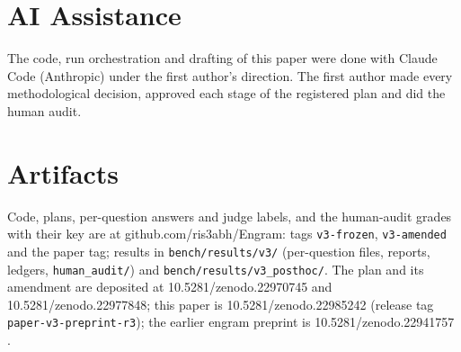 \documentclass[11pt]{article}
\begin{document}
\section*{AI Assistance}
The code, run orchestration and drafting of this paper were done with Claude Code (Anthropic) under the first author's direction. The first author made every methodological decision, approved each stage of the registered plan and did the human audit.

\section*{Artifacts}
Code, plans, per-question answers and judge labels, and the human-audit grades with their key are at github.com/ris3abh/Engram: tags \texttt{v3-frozen}, \texttt{v3-amended} and the paper tag; results in \texttt{bench/\allowbreak{}results/\allowbreak{}v3/\allowbreak{}} (per-question files, reports, ledgers, \texttt{human\_\allowbreak{}audit/\allowbreak{}}) and \texttt{bench/\allowbreak{}results/\allowbreak{}v3\_\allowbreak{}posthoc/\allowbreak{}}. The plan and its amendment are deposited at 10.5281/zenodo.22970745 and 10.5281/zenodo.22977848; this paper is 10.5281/zenodo.22985242 (release tag \texttt{paper-v3-preprint-r3}); the earlier engram preprint is 10.5281/zenodo.22941757 \citep{sharma2026typed}.


\appendix
\onecolumn
\FloatBarrier
\end{document}
